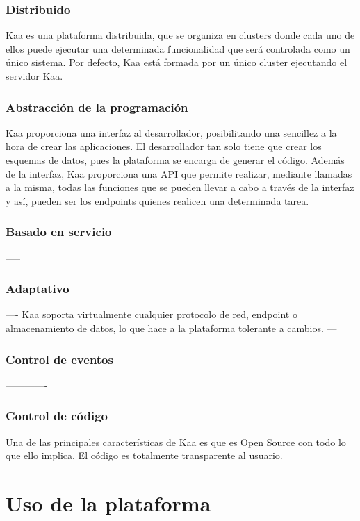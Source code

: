 \documentclass[12pt, twoside]{book}
\begin{document}
\subsubsection*{Distribuido}
Kaa es una plataforma distribuida, que se organiza en clusters donde cada uno de ellos puede ejecutar una determinada funcionalidad que será controlada como un único sistema. Por defecto, Kaa está formada por un único cluster ejecutando el servidor Kaa. 




\subsubsection*{Abstracción de la programación}
Kaa proporciona una interfaz al desarrollador, posibilitando una sencillez a la hora de crear las aplicaciones. El desarrollador tan solo tiene que crear los esquemas de datos, pues la plataforma se encarga de generar el código. Además de la interfaz, Kaa proporciona una API que permite realizar, mediante llamadas a la misma, todas las funciones que se pueden llevar a cabo a través de la interfaz y así, pueden ser los endpoints quienes realicen una determinada tarea.
\subsubsection*{Basado en servicio}
-----

\subsubsection*{Adaptativo}
----
Kaa soporta virtualmente cualquier protocolo de red, endpoint o almacenamiento de datos, lo que hace a la plataforma tolerante a cambios.
---


\subsubsection*{Control de eventos}
-------------



\subsubsection*{Control de código}
Una de las principales características de Kaa es que es Open Source con todo lo que ello implica. El código es totalmente transparente al usuario.


\section{Uso de la plataforma}
\end{document}
